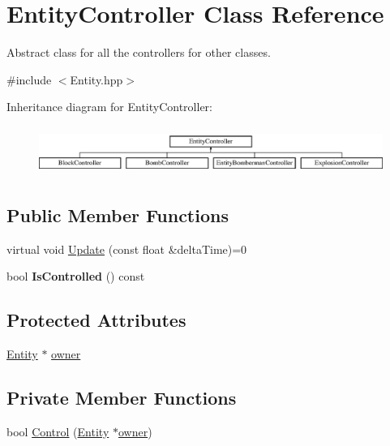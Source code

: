 \hypertarget{class_entity_controller}{}\section{Entity\+Controller Class Reference}
\label{class_entity_controller}


Abstract class for all the controllers for other classes.  




{\ttfamily \#include $<$Entity.\+hpp$>$}

Inheritance diagram for Entity\+Controller\+:\begin{figure}[H]
\begin{center}
\leavevmode
\includegraphics[height=1.618497cm]{class_entity_controller}
\end{center}
\end{figure}
\subsection*{Public Member Functions}
\begin{DoxyCompactItemize}
\item 
virtual void \mbox{\hyperlink{class_entity_controller_ab7f285a1c788ab04b9f0c0260dc8c523}{Update}} (const float \&delta\+Time)=0
\item 
\mbox{\label{class_entity_controller_ab446bd5d49bb62ca8d6d9550c9a50790}} 
bool {\bfseries Is\+Controlled} () const
\end{DoxyCompactItemize}
\subsection*{Protected Attributes}
\begin{DoxyCompactItemize}
\item 
\mbox{\hyperlink{class_entity}{Entity}} $\ast$ \mbox{\hyperlink{class_entity_controller_ae1cec9b9d4305b346d4a4dd0965dd136}{owner}}
\end{DoxyCompactItemize}
\subsection*{Private Member Functions}
\begin{DoxyCompactItemize}
\item 
bool \mbox{\hyperlink{class_entity_controller_acd8733f9db40bb100708e3c890279288}{Control}} (\mbox{\hyperlink{class_entity}{Entity}} $\ast$\mbox{\hyperlink{class_entity_controller_ae1cec9b9d4305b346d4a4dd0965dd136}{owner}})
\end{DoxyCompactItemize}

